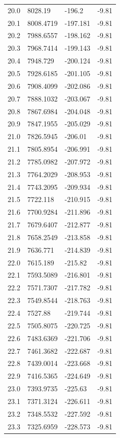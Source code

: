 \begin{table}[H]
\begin{tabular}{llll}
20.0 & 8028.19 & -196.2 & -9.81 \\
20.1 & 8008.4719 & -197.181 & -9.81 \\
20.2 & 7988.6557 & -198.162 & -9.81 \\
20.3 & 7968.7414 & -199.143 & -9.81 \\
20.4 & 7948.729 & -200.124 & -9.81 \\
20.5 & 7928.6185 & -201.105 & -9.81 \\
20.6 & 7908.4099 & -202.086 & -9.81 \\
20.7 & 7888.1032 & -203.067 & -9.81 \\
20.8 & 7867.6984 & -204.048 & -9.81 \\
20.9 & 7847.1955 & -205.029 & -9.81 \\
21.0 & 7826.5945 & -206.01 & -9.81 \\
21.1 & 7805.8954 & -206.991 & -9.81 \\
21.2 & 7785.0982 & -207.972 & -9.81 \\
21.3 & 7764.2029 & -208.953 & -9.81 \\
21.4 & 7743.2095 & -209.934 & -9.81 \\
21.5 & 7722.118 & -210.915 & -9.81 \\
21.6 & 7700.9284 & -211.896 & -9.81 \\
21.7 & 7679.6407 & -212.877 & -9.81 \\
21.8 & 7658.2549 & -213.858 & -9.81 \\
21.9 & 7636.771 & -214.839 & -9.81 \\
22.0 & 7615.189 & -215.82 & -9.81 \\
22.1 & 7593.5089 & -216.801 & -9.81 \\
22.2 & 7571.7307 & -217.782 & -9.81 \\
22.3 & 7549.8544 & -218.763 & -9.81 \\
22.4 & 7527.88 & -219.744 & -9.81 \\
22.5 & 7505.8075 & -220.725 & -9.81 \\
22.6 & 7483.6369 & -221.706 & -9.81 \\
22.7 & 7461.3682 & -222.687 & -9.81 \\
22.8 & 7439.0014 & -223.668 & -9.81 \\
22.9 & 7416.5365 & -224.649 & -9.81 \\
23.0 & 7393.9735 & -225.63 & -9.81 \\
23.1 & 7371.3124 & -226.611 & -9.81 \\
23.2 & 7348.5532 & -227.592 & -9.81 \\
23.3 & 7325.6959 & -228.573 & -9.81 \\

\end{tabular}
\end{table}

